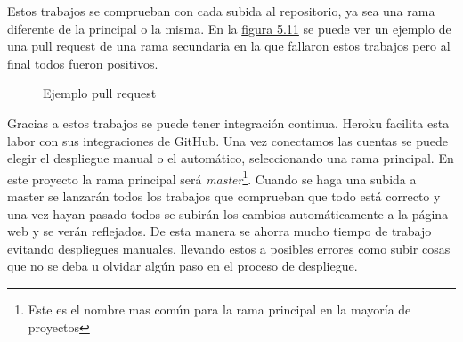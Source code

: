 Estos trabajos se comprueban con cada subida al repositorio, ya sea una rama
diferente de la principal o la misma. En la \hyperref[fig:Ejemplo pull request]{figura 5.11}
se puede ver un ejemplo de una pull request de una rama secundaria en la que
fallaron estos trabajos pero al final todos fueron positivos.

\begin{figure}[htb]
  \centering
  \scalebox{.8}{\texttt{[image: CI]}}
  \caption[Ejemplo pull request]{Ejemplo pull request}
  \label{fig:Ejemplo pull request}
\end{figure}

Gracias a estos trabajos se puede tener integración continua. Heroku facilita
esta labor con sus integraciones de GitHub. Una vez conectamos las cuentas se
puede elegir el despliegue manual o el automático, seleccionando una rama principal.
En este proyecto la rama principal será \textit{master}\footnote{Este es el nombre mas común para la rama principal en la mayoría de proyectos}. Cuando se haga una subida a master
se lanzarán todos los trabajos que comprueban que todo está correcto y una vez hayan
pasado todos se subirán los cambios automáticamente a la página web y se verán reflejados.
De esta manera se ahorra mucho tiempo de trabajo evitando despliegues manuales, llevando estos
a posibles errores como subir cosas que no se deba u olvidar algún paso en el proceso
de despliegue.
